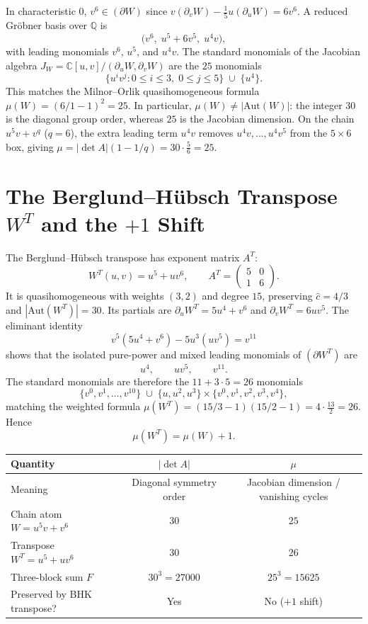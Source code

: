 \documentclass[11pt]{amsart}
\begin{document}
In characteristic $0$, $v^6\in(\partial W)$ since $v(\partial_v W)-\tfrac{1}{5}u(\partial_u W)=6v^6$. A reduced Gr\"obner basis over $\mathbb{Q}$ is
\[
  \bigl(v^6,\;u^5+6v^5,\;u^4v\bigr),
\]
with leading monomials $v^6$, $u^5$, and $u^4v$. The standard monomials of the Jacobian algebra $J_W=\mathbb{C}[u,v]/(\partial_u W,\partial_v W)$ are the $25$ monomials
\[
  \{u^i v^j : 0\le i\le 3,\; 0\le j\le 5\}\;\cup\;\{u^4\}.
\]
This matches the Milnor--Orlik quasihomogeneous formula $\mu(W)=(6/1-1)^2=25$. In particular, $\mu(W)\neq|\mathrm{Aut}(W)|$: the integer $30$ is the diagonal group order, whereas $25$ is the Jacobian dimension. On the chain $u^5v+v^q$ ($q=6$), the extra leading term $u^4v$ removes $u^4v,\dots,u^4v^5$ from the $5\times 6$ box, giving $\mu=|\det A|(1-1/q)=30\cdot\tfrac{5}{6}=25$.

\section{The Berglund--H\"ubsch Transpose $W^T$ and the $+1$ Shift}

The Berglund--H\"ubsch transpose has exponent matrix $A^T$:
\[
  W^T(u,v)=u^5+uv^6,\qquad
  A^T=\begin{pmatrix}5&0\\1&6\end{pmatrix}.
\]
It is quasihomogeneous with weights $(3,2)$ and degree $15$, preserving $\hat{c}=4/3$ and $|\mathrm{Aut}(W^T)|=30$. Its partials are $\partial_u W^T=5u^4+v^6$ and $\partial_v W^T=6uv^5$. The eliminant identity
\[
  v^5(5u^4+v^6)-5u^3(uv^5)=v^{11}
\]
shows that the isolated pure-power and mixed leading monomials of $(\partial W^T)$ are
\[
  u^4,\qquad uv^5,\qquad v^{11}.
\]
The standard monomials are therefore the $11+3\cdot 5=26$ monomials
\[
  \{v^0,v^1,\dots,v^{10}\}\;\cup\;\{u,u^2,u^3\}\times\{v^0,v^1,v^2,v^3,v^4\},
\]
matching the weighted formula $\mu(W^T)=(15/3-1)(15/2-1)=4\cdot\tfrac{13}{2}=26$. Hence
\[
  \mu(W^T)=\mu(W)+1.
\]

\begin{center}
\renewcommand{\arraystretch}{1.2}
\begin{tabular}{@{}lcc@{}}
\toprule
\textbf{Quantity} & $|\det A|$ & $\mu$ \\
\midrule
Meaning & Diagonal symmetry order & Jacobian dimension / vanishing cycles \\
Chain atom $W=u^5v+v^6$ & $30$ & $25$ \\
Transpose $W^T=u^5+uv^6$ & $30$ & $26$ \\
Three-block sum $F$ & $30^3=27000$ & $25^3=15625$ \\
Preserved by BHK transpose? & Yes & No ($+1$ shift) \\
\bottomrule
\end{tabular}
\end{center}
\end{document}
